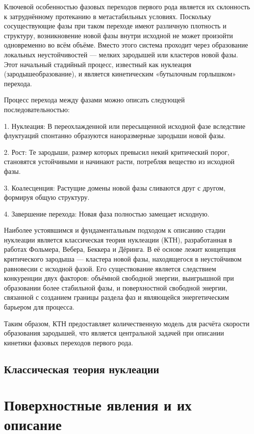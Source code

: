 Ключевой особенностью фазовых переходов первого рода является их склонность к затруднённому протеканию в метастабильных условиях. Поскольку сосуществующие фазы при таком переходе имеют различную плотность и структуру, возникновение новой фазы внутри исходной не может произойти одновременно во всём объёме. Вместо этого система проходит через образование локальных неустойчивостей — мелких зародышей или кластеров новой фазы. Этот начальный стадийный процесс, известный как нуклеация (зародышеобразование), и является кинетическим «бутылочным горлышком» перехода.

Процесс перехода между фазами можно описать следующей последовательностью:

1. Нуклеация: В переохлажденной или пересыщенной исходной фазе вследствие флуктуаций спонтанно образуются наноразмерные зародыши новой фазы.

2. Рост: Те зародыши, размер которых превысил некий критический порог, становятся устойчивыми и начинают расти, потребляя вещество из исходной фазы.

3. Коалесценция: Растущие домены новой фазы сливаются друг с другом, формируя общую структуру.

4. Завершение перехода: Новая фаза полностью замещает исходную.

Наиболее устоявшимся и фундаментальным подходом к описанию стадии нуклеации является классическая теория нуклеации (КТН), разработанная в работах Фольмера, Вебера, Беккера и Дёринга. В её основе лежит концепция критического зародыша — кластера новой фазы, находящегося в неустойчивом равновесии с исходной фазой. Его существование является следствием конкуренции двух факторов: объёмной свободной энергии, выигрышной при образовании более стабильной фазы, и поверхностной свободной энергии, связанной с созданием границы раздела фаз и являющейся энергетическим барьером для процесса.

Таким образом, КТН предоставляет количественную модель для расчёта скорости образования зародышей, что является центральной задачей при описании кинетики фазовых переходов первого рода.

\subsection{Классическая теория нуклеации}



\section{Поверхностные явления и их описание}

